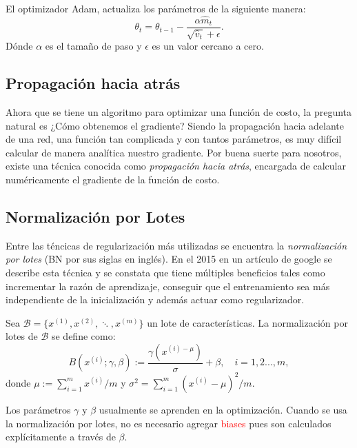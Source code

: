El optimizador Adam, actualiza los parámetros de la siguiente manera:
\begin{equation}
    \theta_t = \theta_{t-1} - \frac{\alpha \hat m_t}{\sqrt{\hat v_t} + \epsilon}.
\end{equation}
Dónde $\alpha$ es el tamaño de paso y $\epsilon$ es un valor cercano a cero.
\subsection{Propagación hacia atrás}
Ahora que se tiene un algoritmo para optimizar una función de costo, la pregunta natural es ¿Cómo obtenemos el gradiente? Siendo la propagación hacia adelante de una red, una función tan complicada y con tantos parámetros, es muy difícil calcular de manera analítica nuestro gradiente. Por buena suerte para nosotros, existe una técnica conocida como \textsl{propagación hacia atrás}, encargada de calcular numéricamente el gradiente de la función de costo.


\subsection{Normalización por Lotes}
Entre las téncicas de regularización más utilizadas se encuentra la \textsl{normalización por lotes} (BN por sus siglas en inglés). En el 2015 en un artículo de google \cite{batchNormalization} se describe esta técnica y se constata que tiene múltiples beneficios tales como incrementar la razón de aprendizaje, conseguir que el entrenamiento sea más independiente de la inicialización y además actuar como regularizador.

\begin{definition}
    Sea $\mathcal{B} = \{x^{(1)}, x^{(2)}, \ddots, x^{(m)}\}$ un lote de características. La normalización por lotes de $\mathcal B$ se define como:
    \begin{equation}
        B(x^{(i)}; \gamma, \beta) := \frac{\gamma(x^{(i) - \mu})}{\sigma} + \beta, \quad i=1,2...,m,
    \end{equation}
    donde  $\mu := \sum^m_{i=1}x^{(i)}/m$ y $\sigma^2 = \sum^m_{i=1}(x^{(i)}-\mu)^2/m$.
\end{definition}
Los parámetros $\gamma$ y $\beta$ usualmente se aprenden en la optimización. Cuando se usa la normalización por lotes, no es necesario agregar \textcolor{red}{biases} pues son calculados explícitamente a través de $\beta$.

